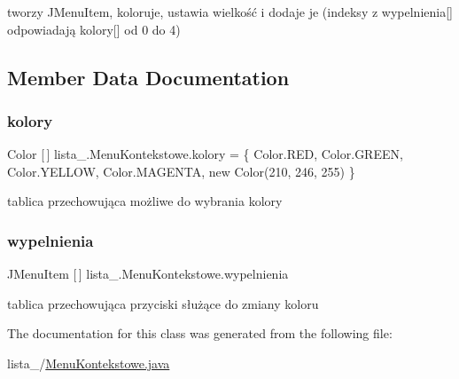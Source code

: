 tworzy J\+Menu\+Item, koloruje, ustawia wielkość i dodaje je (indeksy z wypelnienia\mbox{[}\mbox{]} odpowiadają kolory\mbox{[}\mbox{]} od 0 do 4) 

\subsection{Member Data Documentation}
\mbox{\label{classlista__5_1_1_menu_kontekstowe_ae96bde96586b2e16da0b5d18bc679f4c}} 
\subsubsection{\texorpdfstring{kolory}{kolory}}
{\footnotesize\ttfamily Color \mbox{[}$\,$\mbox{]} lista\+\_.\+Menu\+Kontekstowe.\+kolory = \{ Color.\+R\+ED, Color.\+G\+R\+E\+EN, Color.\+Y\+E\+L\+L\+OW, Color.\+M\+A\+G\+E\+N\+TA, new Color(210, 246, 255) \}}

tablica przechowująca możliwe do wybrania kolory \mbox{\label{classlista__5_1_1_menu_kontekstowe_a95c06de0ee36c780699c2a1efa4b30d0}} 
\subsubsection{\texorpdfstring{wypelnienia}{wypelnienia}}
{\footnotesize\ttfamily J\+Menu\+Item \mbox{[}$\,$\mbox{]} lista\+\_.\+Menu\+Kontekstowe.\+wypelnienia}

tablica przechowująca przyciski służące do zmiany koloru 

The documentation for this class was generated from the following file\+:\begin{DoxyCompactItemize}
\item 
lista\+\_/\mbox{\hyperlink{_menu_kontekstowe_8java}{Menu\+Kontekstowe.\+java}}\end{DoxyCompactItemize}
